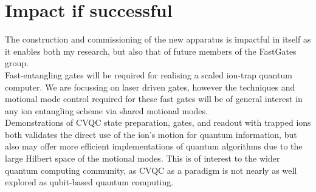 \documentclass[12pt]{article}
\begin{document}
\section{Impact if successful}
\noindent The construction and commissioning of the new apparatus is impactful in itself as it enables both my research, but also that of future members of the FastGates group.\\

\noindent Fast-entangling gates will be required for realising a scaled ion-trap quantum computer. We are focussing on laser driven gates, however the techniques and motional mode control required for these fast gates will be of general interest in any ion entangling scheme via shared motional modes.\\

\noindent Demonstrations of CVQC state preparation, gates, and readout with trapped ions both validates the direct use of the ion's motion for quantum information, but also may offer more efficient implementations of quantum algorithms due to the large Hilbert space of the motional modes. This is of interest to the wider quantum computing community, as CVQC as a paradigm is not nearly as well explored as qubit-based quantum computing.\\
\end{document}
